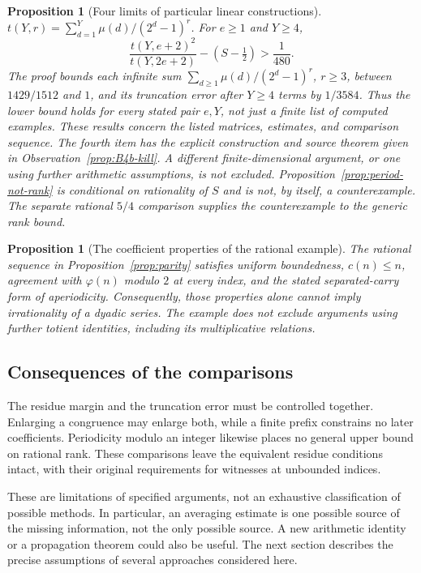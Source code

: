 \documentclass[11pt]{article}
\theoremstyle{plain}
\newtheorem{prop}[thm]{Proposition}
\theoremstyle{definition}
\theoremstyle{remark}
\begin{document}
\begin{prop}[Four limits of particular linear constructions]
$t(Y,r)=\sum_{d=1}^{Y}\mu(d)/(2^d-1)^r$. For $e\ge1$ and $Y\ge4$,
\[
 \frac{t(Y,e+2)^2}{t(Y,2e+2)}-(S-\tfrac12)>\frac1{480}.
\]
The proof bounds each infinite sum
$\sum_{d\ge1}\mu(d)/(2^d-1)^r$, $r\ge3$, between $1429/1512$ and $1$,
and its truncation error after $Y\ge4$ terms by $1/3584$.
Thus the lower bound holds for every stated pair $e,Y$, not just a finite
list of computed examples.
These results concern the listed matrices, estimates, and comparison
sequence. The fourth item has the explicit construction and source theorem given
in Observation~\ref{prop:B4b-kill}. A different finite-dimensional argument,
or one using further arithmetic assumptions, is not excluded.
Proposition~\ref{prop:period-not-rank} is conditional on rationality of
$S$ and is not, by itself, a counterexample. The separate rational $5/4$
comparison supplies the counterexample to the generic rank bound.
\end{prop}

\begin{prop}[The coefficient properties of the rational example]
\label{prop:b7}
The rational sequence in Proposition~\ref{prop:parity} satisfies uniform
boundedness, $c(n)\le n$, agreement with $\varphi(n)$ modulo $2$ at every
index, and the stated separated-carry form of aperiodicity. Consequently,
those properties alone cannot imply irrationality of a dyadic series.
The example does not exclude arguments using further totient identities,
including its multiplicative relations.
\end{prop}

\subsection{Consequences of the comparisons}

The residue margin and the truncation error must be controlled
together. Enlarging a congruence may enlarge both, while a finite
prefix constrains no later coefficients. Periodicity modulo an
integer likewise places no general upper bound on rational rank.
These comparisons leave the equivalent residue conditions intact,
with their original requirements for witnesses at unbounded indices.

These are limitations of specified arguments, not an exhaustive
classification of possible methods. In particular, an averaging estimate is
one possible source of the missing information, not the only possible
source. A new arithmetic identity or a propagation theorem could also be
useful. The next section describes the precise assumptions of several
approaches considered here.
\end{document}
